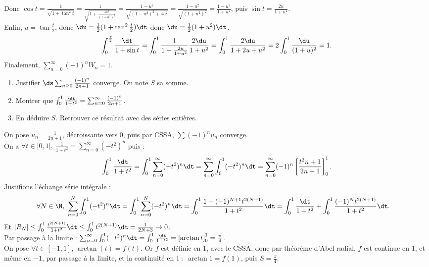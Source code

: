 \documentclass[11pt]{article}
\begin{document}
\begin{ex}{}{}
    Donc $\cos t = \frac{1}{\sqrt{1+\tan^2t}}=\frac{1}{\sqrt{1+\frac{4u^2}{(1-u^2)^2}}}=\frac{1-u^2}{\sqrt{(1-u^2)^2+4u^2}}=\frac{1-u^2}{\sqrt{(1+u^2)^2}}=\frac{1-u^2}{1+u^2}$, puis $\sin t = \frac{2u}{1+u^2}$.\\
    Enfin, $u=\tan\frac{t}{2}$, donc $\du = \frac{1}{2}(1+\tan^2 \frac{t}{2})\dt$ donc $\du = \frac{1}{2}(1+u^2)\dt$.
    \begin{equation*}
        \int_0^{\frac{\pi}{2}}\frac{\dt}{1+\sin t} = \int_0^1\frac{1}{1+\frac{2u}{1+u^2}}\frac{2\du}{1+u^2} = \int_0^1\frac{2\du}{1+2u+u^2}=2\int_0^1\frac{\du}{(1+u)^2}=1.
    \end{equation*}
    Finalement, $\sum_{n=0}^\infty(-1)^nW_n=1$.
\end{ex}

\pagebreak

\begin{ex}{}{}
    \begin{enumerate}
        \item Justifier $\ds\sum_{n\geq0}\frac{(-1)^n}{2n+1}$ converge. On note $S$ sa somme.
        \item Montrer que $\int_0^1\frac{\dt}{1+t^2}=\sum_{n=0}^\infty\frac{(-1)^n}{2n+1}$.
        \item En déduire $S$. Retrouver ce résultat avec des séries entières.
    \end{enumerate}
    \tcblower
     On pose $u_n=\frac{1}{2n+1}$, décroissante vers 0, puis par CSSA, $\sum(-1)^nu_n$ converge.\\
     On a $\forall t \in [0,1[, ~ \frac{1}{1+t^2}=\sum_{n=0}^{\infty}(-t^2)^n$ puis :
    \begin{equation*}
        \int_0^1\frac{\dt}{1+t^2} = \int_0^1 \sum_{n=0}^\infty(-t^2)^n\dt = \sum_{n=0}^{\infty}\int_0^1(-t^2)^n\dt=\sum_{n=0}^\infty(-1)^n\left[ \frac{t^2{n+1}}{2n+1} \right]^1_0.
    \end{equation*}
    Justifions l'échange série intégrale :
    \begin{align*}
        \forall N \in \N, ~ \sum_{n=0}^N\int_0^1(-t^2)^n\dt&=\int_0^1\sum_{n=0}^N(-t^2)^n\dt=\int_0^1\frac{1-(-1)^{N+1}t^{2(N+1)}}{1+t^2}\dt=\int_0^1\frac{\dt}{1+t^2}+\int_0^1\frac{(-1)^Nt^{2(N+1)}}{1+t^2}\dt.
    \end{align*}
    Et $|R_N|\leq\int_0^1\frac{t^{2(N+1)}}{1+t^2}\dt\leq\int_0^1t^{2(N+1)}\dt=\frac{1}{2N+3}\to0$.\\
    Par passage à la limite : $\sum_{n=0}^\infty\int_0^1(-t^2)^n\dt = \int_0^1\frac{\dt}{1+t^2}=\left[ \arctan t \right]_0^1=\frac{\pi}{4}$.\\
     On pose $\forall t \in [-1,1]$, $\arctan(t) = f(t)$. Or $f$ est définie en 1, avec le CSSA, donc par théorème d'Abel radial, $f$ est continue en 1, et même en $-1$, par passage à la limite, et la continuité en 1 : $\arctan 1 = f(1)$, puis $S=\frac{\pi}{4}$.
\end{ex}
\end{document}
